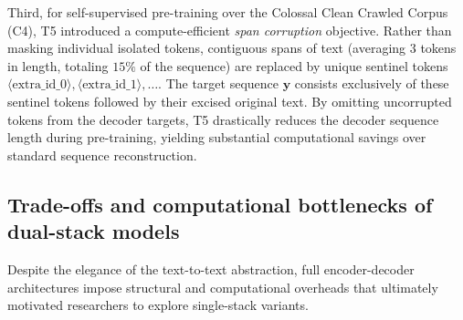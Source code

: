 \documentclass[../../main.tex]{subfiles}
\begin{document}
Third, for self-supervised pre-training over the Colossal Clean Crawled Corpus (C4), T5 introduced a compute-efficient \emph{span corruption} objective. Rather than masking individual isolated tokens, contiguous spans of text (averaging 3 tokens in length, totaling $15\%$ of the sequence) are replaced by unique sentinel tokens $\langle\text{extra\_id\_0}\rangle, \langle\text{extra\_id\_1}\rangle, \dots$. The target sequence $\mathbf{y}$ consists exclusively of these sentinel tokens followed by their excised original text. By omitting uncorrupted tokens from the decoder targets, T5 drastically reduces the decoder sequence length during pre-training, yielding substantial computational savings over standard sequence reconstruction.


\subsection{Trade-offs and computational bottlenecks of dual-stack models}
\label{subsec:tradeoffs_enc_dec}

Despite the elegance of the text-to-text abstraction, full encoder-decoder architectures impose structural and computational overheads that ultimately motivated researchers to explore single-stack variants.
\end{document}
